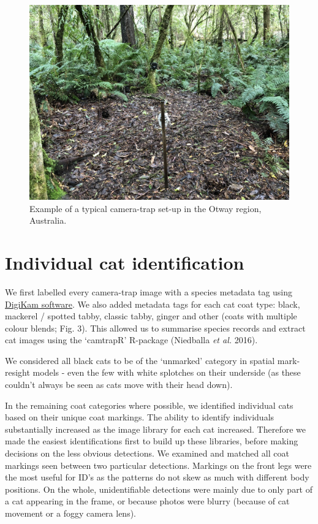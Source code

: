 \documentclass[11pt,a4paper,titlepage,twoside,openright]{style/unimelbthesis}
\begin{document}
\begin{mainmatter}
\newpage
\begin{figure}

{\centering \includegraphics[width=1\linewidth]{figure/camtrap1} 

}

\caption{Example of a typical camera-trap set-up in the Otway region, Australia.}\label{fig:density-cam-photo}
\end{figure}
\newpage

\hypertarget{density-app-id}{%
\section{Individual cat identification}\label{density-app-id}}

We first labelled every camera-trap image with a species metadata tag using \href{https://www.digikam.org}{DigiKam software}. We also added metadata tags for each cat coat type: black, mackerel / spotted tabby, classic tabby, ginger and other (coats with multiple colour blends; Fig. 3). This allowed us to summarise species records and extract cat images using the `camtrapR' R-package (Niedballa \emph{et al.} 2016).

We considered all black cats to be of the `unmarked' category in spatial mark-resight models - even the few with white splotches on their underside (as these couldn't always be seen as cats move with their head down).

In the remaining coat categories where possible, we identified individual cats based on their unique coat markings. The ability to identify individuals substantially increased as the image library for each cat increased. Therefore we made the easiest identifications first to build up these libraries, before making decisions on the less obvious detections. We examined and matched all coat markings seen between two particular detections. Markings on the front legs were the most useful for ID's as the patterns do not skew as much with different body positions. On the whole, unidentifiable detections were mainly due to only part of a cat appearing in the frame, or because photos were blurry (because of cat movement or a foggy camera lens).


\end{mainmatter}
\end{document}
